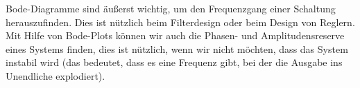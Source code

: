 %
Bode-Diagramme sind äußerst wichtig, um den Frequenzgang einer Schaltung herauszufinden. Dies ist nützlich beim Filterdesign oder beim Design von Reglern. Mit Hilfe von Bode-Plots können wir auch die Phasen- und Amplitudensreserve eines Systems finden, dies ist nützlich, wenn wir nicht möchten, dass das System instabil wird (das bedeutet, dass es eine Frequenz gibt, bei der die Ausgabe ins Unendliche explodiert).
%
%
%
\begin{flushright}
  \textit{\autorA}
\end{flushright}
%
